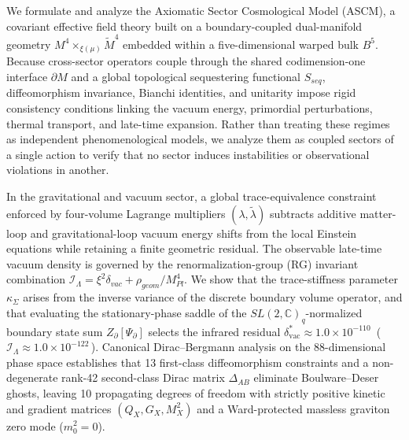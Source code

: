 \documentclass[aps,prd,onecolumn,superscriptaddress,nofootinbib,longbibliography,10pt]{revtex4-2}
\begin{document}
  We formulate and analyze the Axiomatic Sector Cosmological Model (ASCM), a covariant effective field theory built on a boundary-coupled dual-manifold geometry \(M^4 \times_{\xi(\mu)} \tilde{M}^4\) embedded within a five-dimensional warped bulk \(B^5\). Because cross-sector operators couple through the shared codimension-one interface \(\partial M\) and a global topological sequestering functional \(S_{seq}\), diffeomorphism invariance, Bianchi identities, and unitarity impose rigid consistency conditions linking the vacuum energy, primordial perturbations, thermal transport, and late-time expansion. Rather than treating these regimes as independent phenomenological models, we analyze them as coupled sectors of a single action to verify that no sector induces instabilities or observational violations in another.


  In the gravitational and vacuum sector, a global trace-equivalence constraint enforced by four-volume Lagrange multipliers \((\lambda, \tilde{\lambda})\) subtracts additive matter-loop and gravitational-loop vacuum energy shifts from the local Einstein equations while retaining a finite geometric residual. The observable late-time vacuum density is governed by the renormalization-group (RG) invariant combination \(\mathcal{I}_\Lambda = \xi^2 \delta_{vac} + \rho_{geom}/M_{Pl}^4\). We show that the trace-stiffness parameter \(\kappa_\Sigma\) arises from the inverse variance of the discrete boundary volume operator, and that evaluating the stationary-phase saddle of the \(SL(2,\mathbb{C})_q\)-normalized boundary state sum \(Z_\partial[\Psi_\partial]\) selects the infrared residual \(\delta_{\mathrm{vac}}^* \approx 1.0 \times 10^{-110}\,\) (\(\mathcal{I}_\Lambda \approx 1.0 \times 10^{-122}\,\)). Canonical Dirac–Bergmann analysis on the 88-dimensional phase space establishes that 13 first-class diffeomorphism constraints and a non-degenerate rank-42 second-class Dirac matrix \(\Delta_{AB}\) eliminate Boulware–Deser ghosts, leaving 10 propagating degrees of freedom with strictly positive kinetic and gradient matrices \((Q_X, G_X, M_X^2)\) and a Ward-protected massless graviton zero mode (\(m_0^2 = 0\)).
\end{document}
